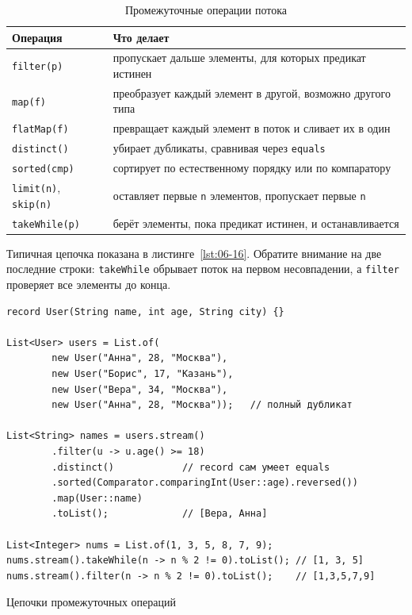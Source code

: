 \begin{table}[htbp]
\caption{Промежуточные операции потока}
\label{tab:06-6}
\centering
\begin{tabular}{L{4.4cm}L{10.2cm}}
\toprule
Операция & Что делает \\
\midrule
\texttt{filter(p)} & пропускает дальше элементы, для которых предикат истинен \\
\texttt{map(f)} & преобразует каждый элемент в другой, возможно другого типа \\
\texttt{flatMap(f)} & превращает каждый элемент в поток и сливает их в один \\
\texttt{distinct()} & убирает дубликаты, сравнивая через \texttt{equals} \\
\texttt{sorted(cmp)} & сортирует по естественному порядку или по компаратору \\
\texttt{limit(n)}, \texttt{skip(n)} & оставляет первые \texttt{n} элементов, пропускает первые \texttt{n} \\
\texttt{takeWhile(p)} & берёт элементы, пока предикат истинен, и останавливается \\
\bottomrule
\end{tabular}
\end{table}

Типичная цепочка показана в листинге~\ref{lst:06-16}. Обратите внимание на две
последние строки: \texttt{takeWhile} обрывает поток на первом несовпадении, а
\texttt{filter} проверяет все элементы до конца.

\begin{listing}[H]
\begin{verbatim}
record User(String name, int age, String city) {}

List<User> users = List.of(
        new User("Анна", 28, "Москва"),
        new User("Борис", 17, "Казань"),
        new User("Вера", 34, "Москва"),
        new User("Анна", 28, "Москва"));   // полный дубликат

List<String> names = users.stream()
        .filter(u -> u.age() >= 18)
        .distinct()            // record сам умеет equals
        .sorted(Comparator.comparingInt(User::age).reversed())
        .map(User::name)
        .toList();             // [Вера, Анна]

List<Integer> nums = List.of(1, 3, 5, 8, 7, 9);
nums.stream().takeWhile(n -> n % 2 != 0).toList(); // [1, 3, 5]
nums.stream().filter(n -> n % 2 != 0).toList();    // [1,3,5,7,9]
\end{verbatim}
\caption{Цепочки промежуточных операций}
\label{lst:06-16}
\end{listing}

